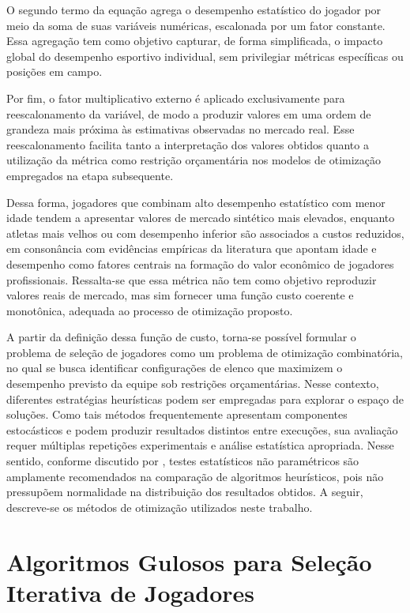 O segundo termo da equação agrega o desempenho estatístico do jogador por meio da soma de suas variáveis numéricas, escalonada por um fator constante. 
Essa agregação tem como objetivo capturar, de forma simplificada, o impacto global do desempenho esportivo individual, 
sem privilegiar métricas específicas ou posições em campo.

Por fim, o fator multiplicativo externo é aplicado exclusivamente para reescalonamento da variável, de modo a produzir valores em uma ordem de grandeza 
mais próxima às estimativas observadas no mercado real. 
Esse reescalonamento facilita tanto a interpretação dos valores obtidos quanto a utilização da métrica como restrição orçamentária 
nos modelos de otimização empregados na etapa subsequente.

Dessa forma, jogadores que combinam alto desempenho estatístico com menor idade tendem a apresentar valores de mercado sintético mais elevados, 
enquanto atletas mais velhos ou com desempenho inferior são associados a custos reduzidos, em consonância com evidências empíricas da literatura que 
apontam idade e desempenho como fatores centrais na formação do valor econômico de jogadores profissionais. \cite{frick2007,muller2017}
Ressalta-se que essa métrica não tem como objetivo reproduzir valores reais de mercado, 
mas sim fornecer uma função custo coerente e monotônica, adequada ao processo de otimização proposto.

A partir da definição dessa função de custo, torna-se possível formular o problema de seleção de jogadores como um problema de otimização combinatória, 
no qual se busca identificar configurações de elenco que maximizem o desempenho previsto da equipe sob restrições orçamentárias. Nesse contexto, 
diferentes estratégias heurísticas podem ser empregadas para explorar o espaço de soluções. Como tais métodos frequentemente apresentam componentes 
estocásticos e podem produzir resultados distintos entre execuções, sua avaliação requer múltiplas repetições experimentais e análise estatística apropriada. 
Nesse sentido, conforme discutido por \cite{Derrac2011}, testes estatísticos não paramétricos são amplamente recomendados na comparação de algoritmos heurísticos, 
pois não pressupõem normalidade na distribuição dos resultados obtidos. A seguir, descreve-se os métodos de otimização utilizados neste trabalho.

\section{Algoritmos Gulosos para Seleção Iterativa de Jogadores}

